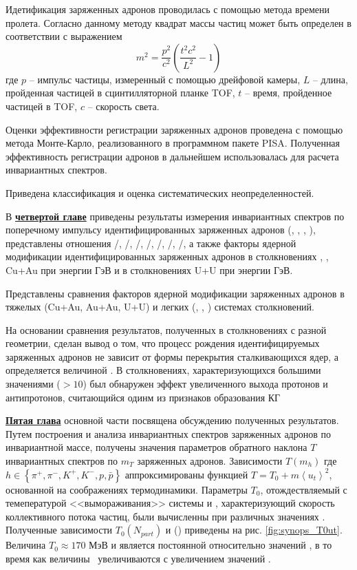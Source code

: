 Идетификация заряженных адронов проводилась с помощью метода времени пролета. Согласно данному методу  квадрат массы частиц может быть определен в соответствии с выражением 
$$m^2 = \frac{p^2}{c^2} \left(  \frac{t^2 c^2}{L^2} - 1\right)$$
где $p$ -- импульс частицы, измеренный с помощью дрейфовой камеры, $L$ -- длина, пройденная частицей в сцинтилляторной планке TOF, $t$ -- время, пройденное частицей в TOF,  $c$ -- скорость света.

Оценки эффективности регистрации заряженных адронов проведена с помощью метода Монте-Карло, реализованного в программном пакете PISA. Полученная эффективность регистрации адронов в дальнейшем использовалась для расчета инвариантных спектров. 

Приведена классификация и оценка систематических неопределенностей. %

\begin{comment}
Формулы в строку без номера добавляются так:
\[
    \lambda_{T_s} = K_x\frac{d{x}}{d{T_s}}, \qquad
    \lambda_{q_s} = K_x\frac{d{x}}{d{q_s}},
\]
\end{comment}

В \underline{\textbf{четвертой главе}} приведены результаты измерения инвариантных спектров по поперечному импульсу идентифицированных заряженных адронов (\pipm, \Kpm, \prot, \aprot), представлены отношения \pim/\pip, \Km/\Kp, \prot/\aprot, \prot/\pip, \aprot/\pim, \Kp/\pip, \Km/\pim, а также факторы ядерной модификации идентифицированных заряженных адронов в столкновениях  \pal, \heau, Cu+Au при энергии  ГэВ и в столкновениях U+U при энергии  ГэВ.

Представлены сравнения факторов ядерной модификации заряженных адронов в тяжелых (Cu+Au, Au+Au, U+U) и легких (\pal, \dau, \heau) системах столкновений.

На основании сравнения результатов, полученных в столкновениях с разной геометрии, сделан вывод о том, что процесс рождения идентифицируемых заряженных адронов не зависит от формы перекрытия сталкивающихся ядер, а определяется величиной \Npart.
В столкновениях, характеризующихся большими значениями \Npart (\Npart$>10$) был обнаружен эффект увеличенного выхода протонов и антипротонов, считающийся одинм из признаков образования КГ 

\underline{\textbf{Пятая глава}} основной части посвящена обсуждению полученных результатов. 
Путем построения и анализа инвариантных спектров заряженных адронов по инвариантной массе, получены значения параметров обратного наклона $T$ инвариантных спектров по $m_T$ заряженных адронов. Зависимости $T(m_h)$ где $h \in \left\{\pi^+, \pi^-, K^+, K^-, p, \bar{p}\right\}$ аппроксимированы функцией $T = T_0 + m\left< u_t\right>^2$, основанной на соображениях термодинамики. Параметры $T_{0}$, отождествляемый с темепературой <<вымораживания>> системы и \ut, характеризующий скорость коллективного потока частиц, были вычисленны при различных значениях \Npart. 
Полученные зависимости $T_{0}(N_{part})$ и \ut(\Npart) приведены на рис. \ref{fig:synops_T0ut}. Величина $T_{0}\approx170$ МэВ и является постоянной относительно значений \Npart, в то время как величины \ut \ увеличиваются с увеличением значений \Npart.


